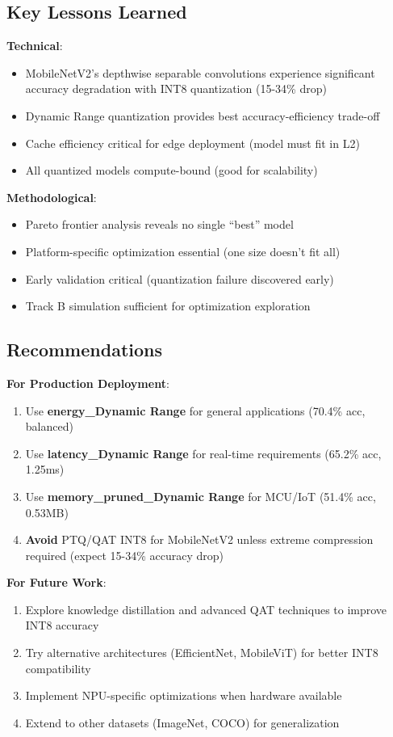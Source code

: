 \documentclass[10pt, a4paper]{article}
\begin{document}
\subsection{Key Lessons Learned}

\textbf{Technical}:
\begin{itemize}
    \item MobileNetV2's depthwise separable convolutions experience significant accuracy degradation with INT8 quantization (15-34\% drop)
    \item Dynamic Range quantization provides best accuracy-efficiency trade-off
    \item Cache efficiency critical for edge deployment (model must fit in L2)
    \item All quantized models compute-bound (good for scalability)
\end{itemize}

\textbf{Methodological}:
\begin{itemize}
    \item Pareto frontier analysis reveals no single ``best'' model
    \item Platform-specific optimization essential (one size doesn't fit all)
    \item Early validation critical (quantization failure discovered early)
    \item Track B simulation sufficient for optimization exploration
\end{itemize}

\subsection{Recommendations}

\textbf{For Production Deployment}:
\begin{enumerate}
    \item Use \textbf{energy\_Dynamic Range} for general applications (70.4\% acc, balanced)
    \item Use \textbf{latency\_Dynamic Range} for real-time requirements (65.2\% acc, 1.25ms)
    \item Use \textbf{memory\_pruned\_Dynamic Range} for MCU/IoT (51.4\% acc, 0.53MB)
    \item \textbf{Avoid} PTQ/QAT INT8 for MobileNetV2 unless extreme compression required (expect 15-34\% accuracy drop)
\end{enumerate}

\textbf{For Future Work}:
\begin{enumerate}
    \item Explore knowledge distillation and advanced QAT techniques to improve INT8 accuracy
    \item Try alternative architectures (EfficientNet, MobileViT) for better INT8 compatibility
    \item Implement NPU-specific optimizations when hardware available
    \item Extend to other datasets (ImageNet, COCO) for generalization
\end{enumerate}
\end{document}
